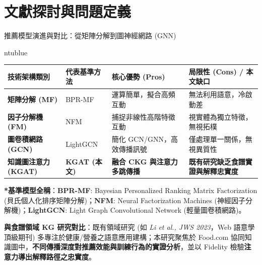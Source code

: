 \documentclass[aspectratio=169, 10pt]{beamer}
\begin{document}
\section{文獻探討與問題定義}

\begin{frame}[t]{推薦模型演進與對比：從矩陣分解到圖神經網路 (GNN)}
  \begin{mybox}{ntublue}{}
    \footnotesize
    \setlength{\tabcolsep}{3.5pt}
    \renewcommand{\arraystretch}{0.80}
    \begin{tabularx}{\textwidth}{l X X X}
      \toprule
      \textbf{技術架構類別} & \textbf{代表基準方法} & \textbf{核心優勢 (Pros)} & \textbf{局限性 (Cons) / 本文缺口} \\
      \midrule
      \textbf{矩陣分解 (MF)} & BPR-MF & 運算簡單，擬合高頻互動 & 無法利用語意，冷啟動差 \\
      \midrule
      \textbf{因子分解機 (FM)} & NFM & 捕捉非線性高階特徵互動 & 視實體為獨立特徵，無視拓樸 \\
      \midrule
      \textbf{圖卷積網路 (GCN)} & LightGCN & 簡化 GCN\slash GNN，高效傳播訊號 & 僅處理單一關係，無視異質性 \\
      \midrule
      \textbf{知識圖注意力 (KGAT)} & \textbf{KGAT (本文)} & \textbf{融合 CKG 與注意力多跳傳播} & \textbf{既有研究缺乏食譜實證與解釋忠實度} \\
      \bottomrule
    \end{tabularx}
    \vspace{0.02cm}
    {\tiny \textbf{*基準模型全稱}：\textbf{BPR-MF}: Bayesian Personalized Ranking Matrix Factorization (貝氏個人化排序矩陣分解)；\textbf{NFM}: Neural Factorization Machines (神經因子分解機)；\textbf{LightGCN}: Light Graph Convolutional Network (輕量圖卷積網路)。}
  \end{mybox}

  \vspace{-0.05cm}
  \footnotesize \textbf{與食譜領域 KG 研究對比}：既有領域研究 (如 \textit{Li et al., JWS 2023}，Web 語意學頂級期刊) 多專注於健康/營養之語意應用建構；本研究聚焦於 Food.com 協同知識圖中，\textbf{不同傳播深度對推薦效能與訓練行為的實證分析}，並以 Fidelity 檢驗\textbf{注意力導出解釋路徑之忠實度}。
\end{frame}
\end{document}
